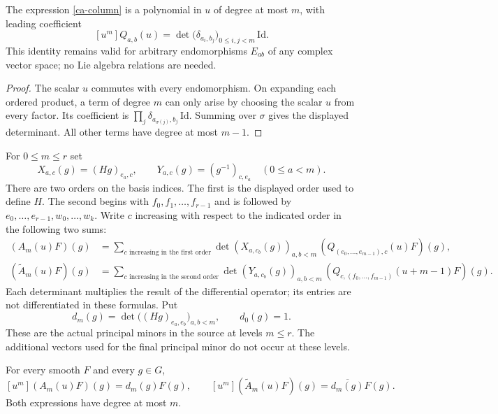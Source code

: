 \begin{lemma}\label{ca-column-leading}
The expression \eqref{ca-column} is a polynomial in $u$ of
degree at most $m$, with leading coefficient
\[
 [u^m]Q_{a,b}(u)=
 \det\bigl(\delta_{a_i,b_j}\bigr)_{0\leq i,j<m}\,\mathrm{Id}.
\]
This identity remains valid for arbitrary endomorphisms
$E_{ab}$ of any complex vector space; no Lie algebra
relations are needed.
\end{lemma}

\begin{proof}
The scalar $u$ commutes with every endomorphism.
On expanding each ordered product, a term of degree $m$
can only arise by choosing the scalar $u$ from every factor.
Its coefficient is
$\prod_j\delta_{a_{\sigma(j)},b_j}\,\mathrm{Id}$.
Summing over $\sigma$ gives the displayed determinant.
All other terms have degree at most $m-1$.
\end{proof}

For $0\leq m\leq r$ set
\[
 X_{a,c}(g)=(Hg)_{e_a,c},\qquad
 Y_{a,c}(g)=(g^{-1})_{c,e_a}\quad(0\leq a<m).
\]
There are two orders on the basis indices.  The first is the
displayed order used to define $H$.  The second begins with
$f_0,f_1,\ldots,f_{r-1}$ and is followed by
$e_0,\ldots,e_{r-1},w_0,\ldots,w_k$.
Write $c$ increasing with respect to the indicated order
in the following two sums:
\begin{align}
 (A_m(u)F)(g)
   &=\sum_{c\text{ increasing in the first order}}
          \det(X_{a,c_b}(g))_{a,b<m}\,
                 (Q_{(e_0,\ldots,e_{m-1}),c}(u)F)(g),
                    \label{ca-Aplus}\\
 (\widetilde A_m(u)F)(g)
   &=\sum_{c\text{ increasing in the second order}}
          \det(Y_{a,c_b}(g))_{a,b<m}\,
        (Q_{c,(f_0,\ldots,f_{m-1})}(u+m-1)F)(g).
                    \label{ca-Aminus}
\end{align}
Each determinant multiplies the result of the differential
operator; its entries are not differentiated in these formulas.
Put
\[
 d_m(g)=\det\bigl((Hg)_{e_a,e_b}\bigr)_{a,b<m},
 \qquad d_0(g)=1.
\]
These are the actual principal minors in the source at levels
$m\leq r$.  The additional vectors used for the final principal
minor do not occur at these levels.

\begin{proposition}\label{ca-A-leading}
For every smooth $F$ and every $g\in G$,
\[
 [u^m](A_m(u)F)(g)=d_m(g)F(g),\qquad
 [u^m](\widetilde A_m(u)F)(g)=\overline{d_m(g)}F(g).
\]
Both expressions have degree at most $m$.
\end{proposition}

